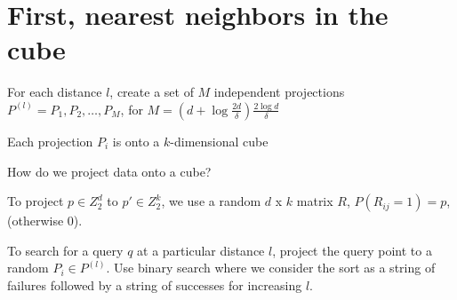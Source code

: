 \documentclass{article}
\begin{document}
\section{First, nearest neighbors in the cube}
For each distance $l$, create a set of $M$ independent projections  $P^{(l)} = P_1, P_2, \ldots, P_M$, for $M = (d + \log \frac{2d}{\delta}) \frac{2 \log d}{\delta} $

Each projection $P_i$ is onto a $k$-dimensional cube


How do we project data onto a cube?

To project $p \in Z^d_2$ to $p' \in Z^k_2$, we use a random $d$ x $k$ matrix $R$, $P(R_{ij} = 1) = p$, (otherwise 0).


To search for a query $q$ at a particular distance $l$, project the query point to a random $P_i \in P^{(l)}$. Use binary search where we consider the sort as a string of failures followed by a string of successes for increasing $l$.







 
\end{document}

